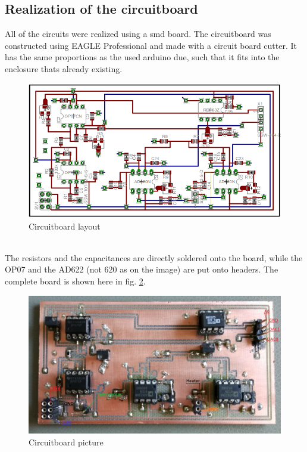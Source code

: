 \documentclass[12pt]{scrartcl}
\begin{document}
    \subsection{Realization of the circuitboard}
      All of the circuits were realized using a smd board. The circuitboard was
      constructed using EAGLE Professional and made with a circuit board cutter.
      It has the same proportions as the used arduino due, such that it fits
      into the enclosure thats already existing.
      \begin{figure}[h]
        \includegraphics[width = \textwidth]{board.png}
        \caption{Circuitboard layout}
        \label{fig4}
      \end{figure}
      \\The resistors and the capacitances are directly soldered onto the board,
      while the OP07 and the AD622 (not 620 as on the image) are put onto
      headers. The complete board is shown here in fig. \ref{fig5}.
      \begin{figure}[h]
        \includegraphics[width = \textwidth]{boardbild.jpg}
        \caption{Circuitboard picture}
        \label{fig5}
      \end{figure}
\end{document}
